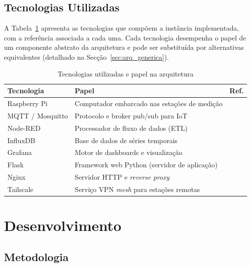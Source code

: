 \documentclass[12pt,a4paper]{report}
\begin{document}
\section{Tecnologias Utilizadas}

A Tabela~\ref{tab:tecnologias} apresenta as tecnologias que compõem a instância implementada, com a referência associada a cada uma. Cada tecnologia desempenha o papel de um componente abstrato da arquitetura e pode ser substituída por alternativas equivalentes (detalhado na Secção~\ref{sec:arq_generica}).

\begin{table}[H]
\centering\small
\caption{Tecnologias utilizadas e papel na arquitetura}
\label{tab:tecnologias}
\begin{tabular}{lll}
\toprule
\textbf{Tecnologia} & \textbf{Papel} & \textbf{Ref.} \\
\midrule
Raspberry Pi       & Computador embarcado nas estações de medição     & \cite{raspberrypi} \\
MQTT / Mosquitto   & Protocolo e broker pub/sub para IoT         & \cite{mqtt} \\
Node-RED           & Processador de fluxo de dados (ETL)         & \cite{nodered} \\
InfluxDB           & Base de dados de séries temporais           & \cite{influxdb} \\
Grafana            & Motor de dashboards e visualização          & \cite{grafana} \\
Flask              & Framework web Python (servidor de aplicação) & \cite{flask} \\
Nginx              & Servidor HTTP e \textit{reverse proxy}       & \cite{nginx} \\
Tailscale          & Serviço VPN \textit{mesh} para estações remotas  & \cite{wireguard} \\
\bottomrule
\end{tabular}
\end{table}

\chapter{Desenvolvimento}

\section{Metodologia}
\label{sec:metodologia}
\end{document}
